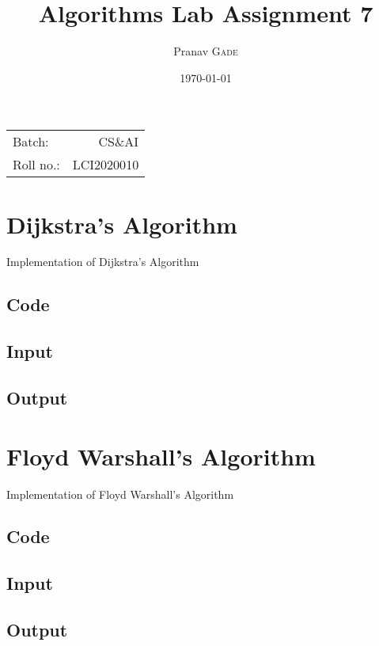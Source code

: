 \documentclass{article}
\title{Algorithms Lab Assignment 7} %
\author{Pranav \textsc{Gade}} %
\date{\today} %
\begin{document}
    \maketitle %

    \begin{center}
        \begin{tabular}{l r}
            Batch:    & CS\&AI     \\
            Roll no.: & LCI2020010
        \end{tabular}
    \end{center}


    \section{Dijkstra's Algorithm}
    Implementation of Dijkstra's Algorithm
    \subsection{Code}
    

    \subsection{Input}
    

    \subsection{Output}
    

    \section{Floyd Warshall's Algorithm}
    Implementation of Floyd Warshall's Algorithm
    \subsection{Code}
    

    \subsection{Input}
    

    \subsection{Output}
    
\end{document}
